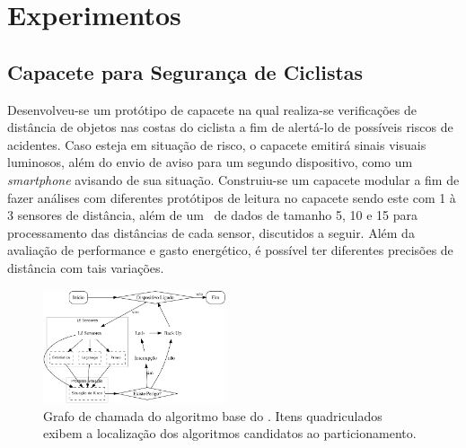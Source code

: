 \section{Experimentos}

    \subsection{Capacete para Segurança de Ciclistas}
        Desenvolveu-se um protótipo de capacete na qual realiza-se verificações de distância de objetos nas costas do ciclista a fim de alertá-lo de possíveis riscos de acidentes.
        Caso esteja em situação de risco, o capacete emitirá sinais visuais luminosos, além do envio de aviso para um segundo dispositivo, como um \textit{smartphone} avisando de sua situação.
        Construiu-se um capacete modular a fim de fazer análises com diferentes protótipos de leitura no capacete sendo este com 1 à 3 sensores de distância, além de um \buffer\ de dados de tamanho 5, 10 e 15 para processamento das distâncias de cada sensor, discutidos a seguir.
        Além da avaliação de performance e gasto energético, é possível ter diferentes precisões de distância com tais variações.
        
        \begin{figure}[h] \centering
            \vspace{-0.5em}
            \includegraphics[width=0.48\textwidth]{img/capacete.png}
            \caption{Grafo de chamada do algoritmo base do \wearable. Itens quadriculados exibem a localização dos algoritmos candidatos ao particionamento.}
            \label{fig:gc}
        \end{figure}
        
